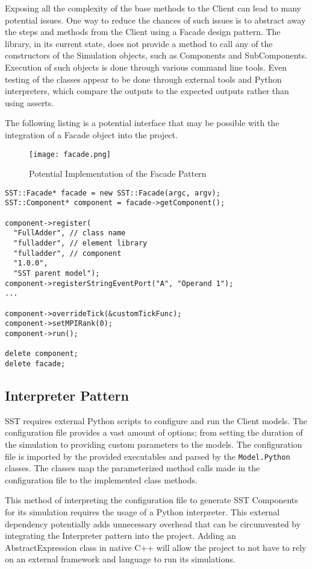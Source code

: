 Exposing all the complexity of the base methods to the Client can lead to many potential issues. One way to reduce the chances of such issues is to abstract away the steps and methods from the Client using a Facade design pattern. The library, in its current state, does not provide a method to call any of the constructors of the Simulation objects, such as Components and SubComponents. Execution of such objects is done through various command line tools. Even testing of the classes appear to be done through external tools and Python interpreters, which compare the outputs to the expected outputs rather than using asserts.

The following listing is a potential interface that may be possible with the integration of a Facade object into the project.

\begin{figure}[h]
  \caption{Potential Implementation of the Facade Pattern}
  \centering
  \texttt{[image: facade.png]}
\end{figure}
\newpage

\begin{lstlisting}[style=customC++,label=facade,caption=Potential Implementation of Facade]
SST::Facade* facade = new SST::Facade(argc, argv);
SST::Component* component = facade->getComponent();

component->register(
  "FullAdder", // class name
  "fulladder", // element library
  "fulladder", // component
  "1.0.0",
  "SST parent model");
component->registerStringEventPort("A", "Operand 1");
...

component->overrideTick(&customTickFunc);
component->setMPIRank(0);
component->run();

delete component;
delete facade;
\end{lstlisting}

\newpage
\subsection{Interpreter Pattern}
SST requires external Python scripts to configure and run the Client models. The configuration file provides a vast amount of options; from setting the duration of the simulation to providing custom parameters to the models. The configuration file is imported by the provided executables and parsed by the \texttt{Model.Python} classes. The classes map the parameterized method calls made in the configuration file to the implemented class methods.

This method of interpreting the configuration file to generate SST Components for its simulation requires the usage of a Python interpreter. This external dependency potentially adds unnecessary overhead that can be circumvented by integrating the Interpreter pattern into the project. Adding an AbstractExpression class in native C++ will allow the project to not have to rely on an external framework and language to run its simulations.

